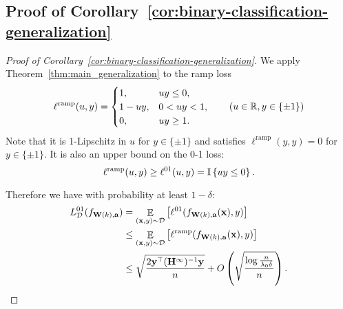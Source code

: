 \subsection{Proof of Corollary~\ref{cor:binary-classification-generalization}} \label{app:proof-cor:binary-classification-generalization}

\begin{proof}[Proof of Corollary~\ref{cor:binary-classification-generalization}]
	We apply Theorem~\ref{thm:main_generalization} to the ramp loss
	\begin{align*}
		 \ell^{\mathrm{ramp}}(u, y) =
		 \begin{cases}
		 1, & uy\le0,\\
		 1-uy, & 0<uy<1,\\
		 0, & uy\ge1.
		 \end{cases} \qquad (u\in\mathbb{R}, y\in\{\pm1\})
	\end{align*}
	Note that it is $1$-Lipschitz in $u$ for $y\in\{\pm1\}$ and satisfies $\ell^{\mathrm{ramp}}(y, y) = 0$ for $y\in\{\pm1\}$. It is also an upper bound on the 0-1 loss:
	\[
	\ell^{\mathrm{ramp}}(u, y) \ge \ell^{01}(u, y) = \mathbb{I}\left\{ uy\le0 \right\}.
	\]
	
	Therefore we have with probability at least $1-\delta$:
	\begin{align*}
	L_{\mathcal{D}}^{01}(f_{\mathbf{W}(k), \mathbf{a}}) 
	&= \mathop\mathbb{E}_{(\mathbf{x}, y)\sim \mathcal{D}} \left[ \ell^{01}(f_{\mathbf{W}(k), \mathbf{a}}(\mathbf{x}), y)  \right] \\
	&\le \mathop\mathbb{E}_{(\mathbf{x}, y)\sim \mathcal{D}} \left[ \ell^{\mathrm{ramp}}(f_{\mathbf{W}(k), \mathbf{a}}(\mathbf{x}), y)  \right] \\
	&\le \sqrt{\frac{2 \mathbf{y}^\top (\mathbf{H}^\infty)^{-1}\mathbf{y} }{n}} + O\left( \sqrt{\frac{\log\frac{n}{\lambda_0\delta}}{n}} \right)  .
	\qedhere
	\end{align*}
\end{proof}
